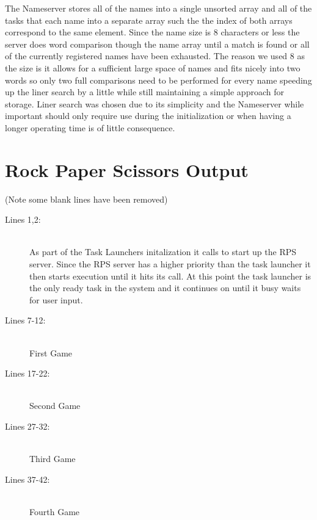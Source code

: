 \documentclass[pdftex,10pt,a4paper]{article}
\begin{document}
The Nameserver stores all of the names into a single unsorted array
and all of the tasks that each name into a separate array such the the
index of both arrays correspond to the same element. Since the name
size is 8 characters or less the server does word comparison though
the name array until a match is found or all of the currently
registered names have been exhausted. The reason we used 8 as the size
is it allows for a sufficient large space of names and fits nicely
into two words so only two full comparisons need to be performed for
every name speeding up the liner search by a little while still
maintaining a simple approach for storage. Liner search was chosen due
to its simplicity and the Nameserver while important should only
require use during the initialization or when having a longer
operating time is of little consequence.


\section*{Rock Paper Scissors Output}



(Note some blank lines have been removed)

\begin{description}
\item[Lines 1,2:] \hfill \\
As part of the Task Launchers initalization it calls  to
start up the RPS server. Since the RPS server has a higher priority
than the task launcher it then starts execution until it hits its
 call. At this point the task launcher is the only
ready task in the system and it continues on until it busy waits for
user input.

\item[Lines 7-12:] \hfill \\
First Game

\item[Lines 17-22:] \hfill \\
Second Game

\item[Lines 27-32:] \hfill \\
Third Game

\item[Lines 37-42:] \hfill \\
Fourth Game
\end{description}
\end{document}
